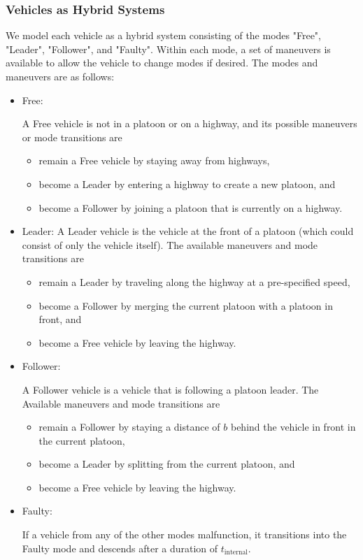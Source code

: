 \subsubsection{Vehicles as Hybrid Systems}
We model each vehicle as a hybrid system \cite{Lygeros98,Lygeros12} consisting of the modes "Free", "Leader", "Follower", and "Faulty". Within each mode, a set of maneuvers is available to allow the vehicle to change modes if desired. The modes and maneuvers are as follows:

\begin{itemize}
\item Free: 

A Free vehicle is not in a platoon or on a highway, and its possible maneuvers or mode transitions are
\begin{itemize}
\item remain a Free vehicle by staying away from highways,
\item become a Leader by entering a highway to create a new platoon, and
\item become a Follower by joining a platoon that is currently on a highway.
\end{itemize} 

\item Leader: 
A Leader vehicle is the vehicle at the front of a platoon (which could consist of only the vehicle itself). The available maneuvers and mode transitions are

\begin{itemize}
\item remain a Leader by traveling along the highway at a pre-specified speed,
\item become a Follower by merging the current platoon with a platoon in front, and
\item become a Free vehicle by leaving the highway.
\end{itemize}

\item Follower: 

A Follower vehicle is a vehicle that is following a platoon leader. The Available maneuvers and mode transitions are 

\begin{itemize}
\item remain a Follower by staying a distance of $b$ behind the vehicle in front in the current platoon,
\item become a Leader by splitting from the current platoon, and
\item become a Free vehicle by leaving the highway.
\end{itemize}

\item Faulty: 

If a vehicle from any of the other modes malfunction, it transitions into the Faulty mode and descends after a duration of $t_\text{internal}$.
\end{itemize}


